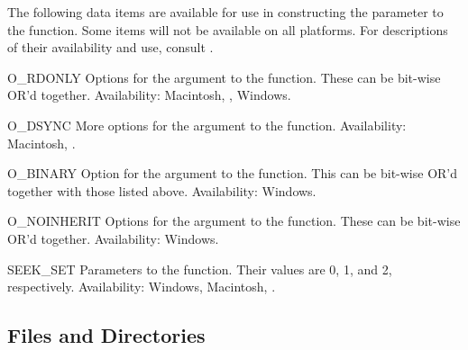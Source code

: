 The following data items are available for use in constructing the
 parameter to the  function.  Some items will
not be available on all platforms.  For descriptions of their availability
and use, consult .

\begin{datadesc}{O_RDONLY}
Options for the  argument to the  function.
These can be bit-wise OR'd together.
Availability: Macintosh, \UNIX, Windows.
\end{datadesc}

\begin{datadesc}{O_DSYNC}
More options for the  argument to the  function.
Availability: Macintosh, \UNIX.
\end{datadesc}

\begin{datadesc}{O_BINARY}
Option for the  argument to the  function.
This can be bit-wise OR'd together with those listed above.
Availability: Windows.
\end{datadesc}

\begin{datadesc}{O_NOINHERIT}
Options for the  argument to the  function.
These can be bit-wise OR'd together.
Availability: Windows.
\end{datadesc}

\begin{datadesc}{SEEK_SET}
Parameters to the  function.
Their values are 0, 1, and 2, respectively.
Availability: Windows, Macintosh, \UNIX.
\end{datadesc}

\subsection{Files and Directories \label{os-file-dir}}

